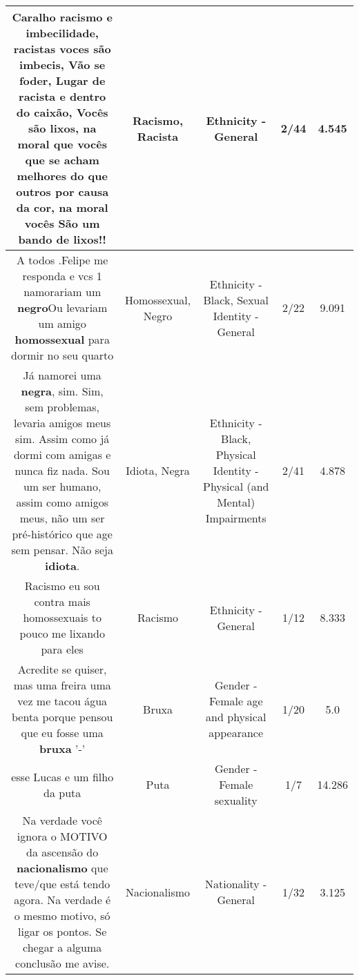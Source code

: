 \documentclass[11pt]{article}
\newlength\mylength
\begin{document}
\begin{center}
\begin{longtable}{|C{.65\mylength}|C{.30\mylength}|C{.12\mylength}|C{.12\mylength}|C{.12\mylength}|}
  \small Caralho \textbf{racismo} e imbecilidade, racistas voces são imbecis, Vão se foder,  Lugar de \textbf{racista} e dentro do caixão, Vocês são lixos, na moral que vocês que se acham melhores do que  outros por causa da cor, na moral vocês São um bando de lixos!!\normalsize   & Racismo, Racista & Ethnicity - General & 2/44 & 4.545 \\  \hline
  \small A todos .Felipe me responda e vcs 1 namorariam um \textbf{negro}Ou levariam um amigo \textbf{homossexual} para dormir no seu quarto\normalsize   & Homossexual, Negro & Ethnicity - Black, Sexual Identity - General & 2/22 & 9.091 \\  \hline
  \small Já namorei uma \textbf{negra}, sim. Sim, sem problemas, levaria amigos meus sim. Assim como já dormi com amigas e nunca fiz nada. Sou um ser humano, assim como amigos meus, não um ser pré-histórico que age sem pensar. Não seja \textbf{idiota}.\normalsize   & Idiota, Negra & Ethnicity - Black, Physical Identity - Physical (and Mental) Impairments & 2/41 & 4.878 \\  \hline
  \small Racismo eu sou contra mais homossexuais to pouco me lixando para eles\normalsize   & Racismo & Ethnicity - General & 1/12 & 8.333 \\  \hline
  \small Acredite se quiser,  mas uma freira uma vez me tacou água benta porque pensou que eu fosse uma \textbf{bruxa} '-'\normalsize   & Bruxa & Gender - Female age and physical appearance & 1/20 & 5.0 \\  \hline
  \small esse Lucas e um filho da puta\normalsize   & Puta & Gender - Female sexuality & 1/7 & 14.286 \\  \hline
  \small Na verdade você ignora o MOTIVO da ascensão do \textbf{nacionalismo} que teve/que está tendo agora. Na verdade é o mesmo motivo, só ligar os pontos. Se chegar a alguma conclusão me avise.\normalsize   & Nacionalismo & Nationality - General & 1/32 & 3.125 \\  \hline

\end{longtable}
\end{center}
\end{document}
